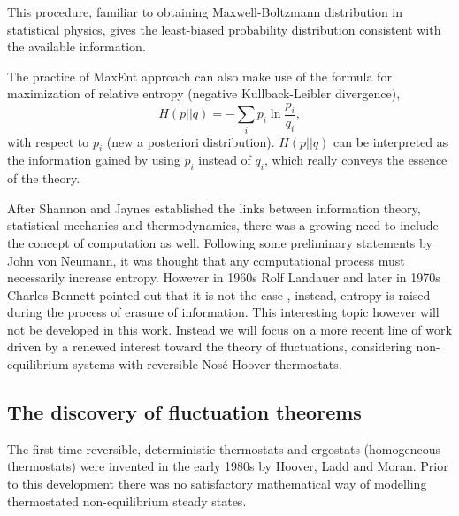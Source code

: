 \documentclass[a4paper,12pt]{article}
\begin{document}
This procedure, familiar to obtaining Maxwell-Boltzmann distribution in statistical physics, gives the least-biased probability distribution consistent with the available information.

The practice of MaxEnt approach can also make use of the formula for maximization of relative entropy (negative Kullback-Leibler divergence),
\begin{equation}
\label{Kullback-Leibler}
    H(p || q) = -\sum_i p_i \ln \frac{p_i}{q_i},
\end{equation}
with respect to $p_i$ (new a posteriori distribution). $H(p||q)$ can be interpreted as the information gained by using $p_i$ instead of $q_i$, which really conveys the essence of the theory.


After Shannon and Jaynes established the links between information theory, statistical mechanics and thermodynamics, there was a growing need to include the concept of computation as well. Following some preliminary statements by John von Neumann, it was thought that any computational process must necessarily increase entropy.
However in 1960s Rolf Landauer and later in 1970s Charles Bennett pointed out that it is not the case \cite{Landauer:2002wc, Bennett:1973ko}, instead, entropy is raised during the process of erasure of information. This interesting topic however will not be developed in this work. Instead we will focus on a more recent line of work driven by a renewed interest toward the theory of fluctuations, considering non-equilibrium systems with reversible Nosé-Hoover thermostats.
\subsection{The discovery of fluctuation theorems}
The first time-reversible, deterministic thermostats and ergostats (homogeneous thermostats) were invented in the early 1980s by Hoover, Ladd and Moran\cite{Hoover:1982dp}. Prior to this development there was no satisfactory mathematical way of modelling thermostated non-equilibrium steady states.
\end{document}
